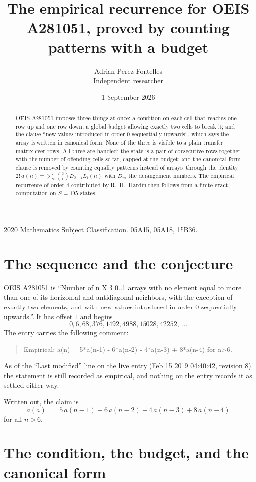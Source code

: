 \documentclass[11pt,a4paper]{article}
\title{The empirical recurrence for OEIS A281051, proved by counting patterns with a budget}
\author{Adrian Perez Fontelles\\ \small Independent researcher}
\date{1 September 2026}
\theoremstyle{plain}
\theoremstyle{definition}
\begin{document}
\maketitle

\begin{abstract}
OEIS A281051 imposes three things at once: a condition on each cell that reaches one row up and
one row down; a global budget allowing exactly two cells to
break it; and the clause ``new values introduced in order $0$ sequentially upwards'', which
says the array is written in canonical form. None of the three is visible to a plain transfer
matrix over rows. All three are handled: the state is a pair of consecutive rows
together with the number of offending cells so far, capped at the budget; and the
canonical-form clause is removed by counting equality patterns instead of arrays, through the
identity $2!\,a(n)=\sum_i\binom{2}{i}D_{2-i}L_i(n)$ with $D_m$ the derangement
numbers. The empirical recurrence of order $4$ contributed by R.~H.~Hardin then follows
from a finite exact computation on $S=195$ states.
\end{abstract}

\noindent\small 2020 Mathematics Subject Classification. 05A15, 05A18, 15B36.\normalsize

\section{The sequence and the conjecture}

OEIS A281051 is ``Number of n X 3 0..1 arrays with no element equal to more than one of its horizontal and antidiagonal neighbors, with the exception of exactly two elements, and with new values introduced in order 0 sequentially upwards.''. It has offset $1$ and begins
\[
0, 6, 68, 376, 1492, 4988, 15028, 42252,\ \dots
\]
The entry carries the following comment:
\begin{quote}\small
Empirical: a(n) = 5*a(n-1) - 6*a(n-2) - 4*a(n-3) + 8*a(n-4) for n>6.
\end{quote}
As of the ``Last modified'' line on the live entry (Feb 15 2019 04:40:42, revision 8) the statement is
still recorded as empirical, and nothing on the entry records it as settled either way.

Written out, the claim is
\begin{equation}\label{eq:conj}
a(n)\;=\;5\,a(n-1) - 6\,a(n-2) - 4\,a(n-3) + 8\,a(n-4)
\end{equation}
for all $n>6$.

\section{The condition, the budget, and the canonical form}
\end{document}
